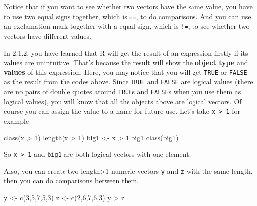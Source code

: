 \documentclass[
]{book}
\newenvironment{Shaded}{\begin{snugshade}}{\end{snugshade}}
\newcommand{\DecValTok}[1]{\textcolor[rgb]{0.00,0.00,0.81}{#1}}
\newcommand{\FunctionTok}[1]{\textcolor[rgb]{0.00,0.00,0.00}{#1}}
\newcommand{\NormalTok}[1]{#1}
\newcommand{\OtherTok}[1]{\textcolor[rgb]{0.56,0.35,0.01}{#1}}
\newcommand{\SpecialCharTok}[1]{\textcolor[rgb]{0.00,0.00,0.00}{#1}}
\begin{document}
Notice that if you want to see whether two vectors have the same value, you have to use two equal signs together, which is \texttt{==}, to do comparisons. And you can use an exclamation mark together with a equal sign, which is \texttt{!=}, to see whether two vectors have different values.

In 2.1.2, you have learned that R will get the result of an expression firstly if its values are unintuitive. That's because the result will show the \textbf{object type} and \textbf{values} of this expression. Here, you may notice that you will get \texttt{TRUE} or \texttt{FALSE} as the result from the codes above. Since \texttt{TRUE} and \texttt{FALSE} are logical values (there are no pairs of double quotes around \texttt{TRUE}s and \texttt{FALSE}s when you use them as logical values), you will know that all the objects above are logical vectors. Of course you can assign the value to a name for future use. Let's take \texttt{x\ \textgreater{}\ 1} for example

\begin{Shaded}
\begin{Highlighting}[]
\FunctionTok{class}\NormalTok{(x }\SpecialCharTok{\textgreater{}} \DecValTok{1}\NormalTok{)}
\FunctionTok{length}\NormalTok{(x }\SpecialCharTok{\textgreater{}} \DecValTok{1}\NormalTok{)}
\NormalTok{big1 }\OtherTok{\textless{}{-}}\NormalTok{ x }\SpecialCharTok{\textgreater{}} \DecValTok{1}
\NormalTok{big1}
\FunctionTok{class}\NormalTok{(big1)}
\end{Highlighting}
\end{Shaded}

So \texttt{x\ \textgreater{}\ 1} and \texttt{big1} are both logical vectors with one element.

Also, you can create two length\textgreater1 numeric vectors \texttt{y} and \texttt{z} with the same length, then you can do comparisons between them.

\begin{Shaded}
\begin{Highlighting}[]
\NormalTok{y }\OtherTok{\textless{}{-}} \FunctionTok{c}\NormalTok{(}\DecValTok{3}\NormalTok{,}\DecValTok{5}\NormalTok{,}\DecValTok{7}\NormalTok{,}\DecValTok{5}\NormalTok{,}\DecValTok{3}\NormalTok{)}
\NormalTok{z }\OtherTok{\textless{}{-}} \FunctionTok{c}\NormalTok{(}\DecValTok{2}\NormalTok{,}\DecValTok{6}\NormalTok{,}\DecValTok{7}\NormalTok{,}\DecValTok{6}\NormalTok{,}\DecValTok{3}\NormalTok{)}
\NormalTok{y }\SpecialCharTok{\textgreater{}}\NormalTok{ z}
\end{Highlighting}
\end{Shaded}
\end{document}
